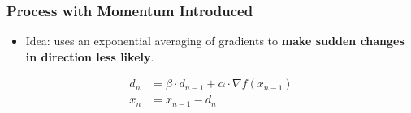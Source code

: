 \subsubsection{Process with Momentum Introduced}
\begin{itemize}
	\item Idea: uses an exponential averaging of gradients to \textbf{make sudden changes in direction less likely}.
\end{itemize}
\begin{align*}
	d_n &= \beta \cdot d_{n-1} + \alpha \cdot\nabla f(x_{n-1})\\
	x_n &= x_{n-1} - d_n
\end{align*}
